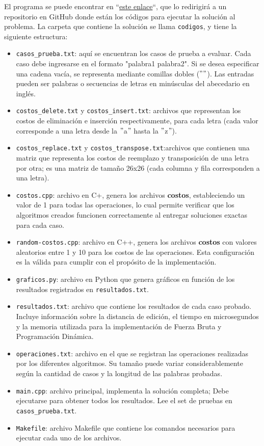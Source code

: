 El programa se puede encontrar en ``\href{https://github.com/luphin/Tarea2y3Algoritmos-FB-PD/tree/main}{este enlace}``, que lo redirigirá a un repositorio en GitHub donde están los códigos para ejecutar la solución al problema.
La carpeta que contiene la solución se llama \texttt{codigos}, y tiene la siguiente estructura:

\begin{itemize}
    \item \verb|casos_prueba.txt|: aquí se encuentran los casos de prueba a evaluar. Cada caso debe ingresarse en el formato "palabra1 palabra2". Si se desea especificar una cadena vacía, se representa mediante comillas dobles ($""$). Las entradas pueden ser palabras o secuencias de letras en minúsculas del abecedario en inglés. 
    \item \verb|costos_delete.txt| y \verb|costos_insert.txt|: archivos que representan los costos de eliminación e inserción respectivamente, para cada letra (cada valor corresponde a una letra desde la $"$a$"$ hasta la $"$z$"$).
    \item \verb|costos_replace.txt| y \verb|costos_transpose.txt|:archivos que contienen una matriz que representa los costos de reemplazo y transposición de una letra por otra; es una matriz de tamaño 26x26 (cada columna y fila corresponden a una letra).
    \item \verb|costos.cpp|: archivo en C+, genera los archivos \textbf{costos}, estableciendo un valor de 1 para todas las operaciones, lo cual permite verificar que los algoritmos creados funcionen correctamente al entregar soluciones exactas para cada caso.
    \item \verb|random-costos.cpp|: archivo en C++, genera los archivos \textbf{costos} con valores aleatorios entre 1 y 10 para los costos de las operaciones. Esta configuración es la válida para cumplir con el propósito de la implementación.
    \item \verb|graficos.py|: archivo en Python que genera gráficos en función de los resultados registrados en \verb|resultados.txt|.
    \item \verb|resultados.txt|: archivo que contiene los resultados de cada caso probado. Incluye información sobre la distancia de edición, el tiempo en microsegundos y la memoria utilizada para la implementación de Fuerza Bruta y Programación Dinámica.
    \item \verb|operaciones.txt|: archivo en el que se registran las operaciones realizadas por los diferentes algoritmos. Su tamaño puede variar considerablemente según la cantidad de casos y la longitud de las palabras probadas.
    \item \verb|main.cpp|: archivo principal, implementa la solución completa; Debe ejecutarse para obtener todos los resultados. Lee el set de pruebas en \verb|casos_prueba.txt|.
    \item \verb|Makefile|: archivo Makefile que contiene los comandos necesarios para ejecutar cada uno de los archivos.
\end{itemize}
